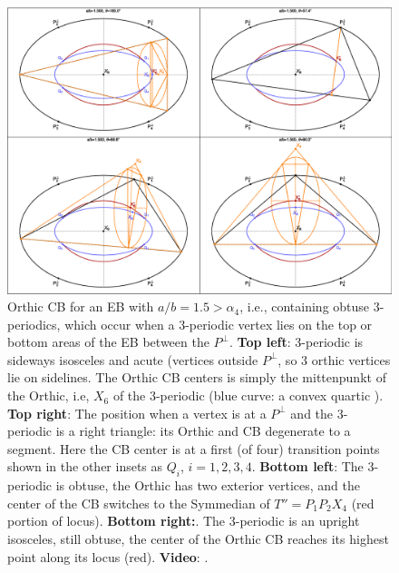 \begin{figure}
    \centering
    \includegraphics[width=\textwidth]{pics_eps_new/0030_cb_ort.eps}
    \caption{Orthic CB for an EB with $a/b=1.5>\alpha_4$, i.e., containing obtuse 3-periodics, which occur when a 3-periodic vertex lies on the top or bottom areas of the EB between the $P^\perp$. \textbf{Top left}: 3-periodic is sideways isosceles and acute (vertices outside $P^\perp$, so 3 orthic vertices lie on sidelines. The Orthic CB centers is simply the mittenpunkt of the Orthic, i.e, $X_6$ of the 3-periodic (blue curve: a convex quartic \cite{garcia2020-ellipses}). \textbf{Top right}: The position when a vertex is at a $P^\perp$ and the 3-periodic is a right triangle: its Orthic and CB degenerate to a segment. Here the CB center is at a first (of four) transition points shown in the other insets as $Q_i$, $i=1,2,3,4$. \textbf{Bottom left}: The 3-periodic is obtuse, the Orthic has two exterior vertices, and the center of the CB switches to the Symmedian of $T''=P_1P_2X_4$ (red portion of locus). \textbf{Bottom right:}. The 3-periodic is an upright isosceles, still obtuse, the center of the Orthic CB reaches its highest point along its locus (red). \textbf{Video}: \cite[PL\#06]{reznik2020-playlist-circum}.}
    \label{fig:cb_ort}
\end{figure}

